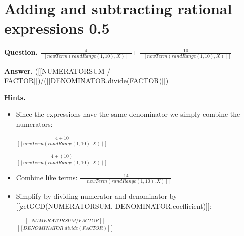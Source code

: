 \documentclass{article}
\begin{document}
\section*{Adding and subtracting rational expressions 0.5}
\textbf{Question.} $\frac{4}{[[new Term(randRange(1, 10), X)]]}$+
            $\frac{10}{[[new Term(randRange(1, 10), X)]]}$

\textbf{Answer.} ([[NUMERATORSUM / FACTOR]])/([[DENOMINATOR.divide(FACTOR)]])

\textbf{Hints.}
\begin{itemize}
  \item Since the expressions have the same denominator we simply combine the numerators:
                
                    $\frac{4 + 10}{[[new Term(randRange(1, 10), X)]]}$
                
                
                    $\frac{4 + (10)}{[[new Term(randRange(1, 10), X)]]}$
  \item Combine like terms:
                $\frac{14}{[[new Term(randRange(1, 10), X)]]}$
  \item Simplify by dividing numerator and denominator by [[getGCD(NUMERATORSUM, DENOMINATOR.coefficient)]]:
                
                $\frac{[[NUMERATORSUM / FACTOR]]}{[[DENOMINATOR.divide(FACTOR)]]}$
\end{itemize}
\end{document}
